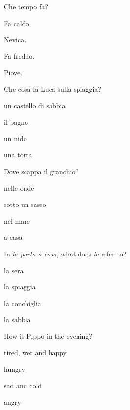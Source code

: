 \documentclass[11pt,a4paper,twoside,openright]{book}
\begin{document}
\begin{exercises}
\item\label{ex:story-cane-mare-1}\relax Che tempo fa?\par\nopagebreak\begin{options}
\item\relax Fa caldo.
\item\relax Nevica.
\item\relax Fa freddo.
\item\relax Piove.
\end{options}
\item\label{ex:story-cane-mare-2}\relax Che cosa fa Luca sulla spiaggia?\par\nopagebreak\begin{options}
\item\relax un castello di sabbia
\item\relax il bagno
\item\relax un nido
\item\relax una torta
\end{options}
\item\label{ex:story-cane-mare-3}\relax Dove scappa il granchio?\par\nopagebreak\begin{options}
\item\relax nelle onde
\item\relax sotto un sasso
\item\relax nel mare
\item\relax a casa
\end{options}
\item\label{ex:story-cane-mare-4}\relax In \textit{la porta a casa}, what does \textit{la} refer to?\par\nopagebreak\begin{options}
\item\relax la sera
\item\relax la spiaggia
\item\relax la conchiglia
\item\relax la sabbia
\end{options}
\item\label{ex:story-cane-mare-5}\relax How is Pippo in the evening?\par\nopagebreak\begin{options}
\item\relax tired, wet and happy
\item\relax hungry
\item\relax sad and cold
\item\relax angry
\end{options}
\end{exercises}
\end{document}
